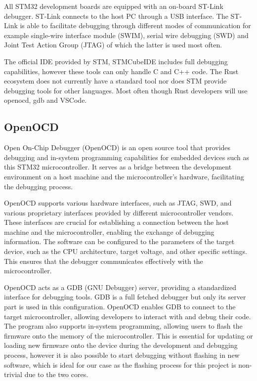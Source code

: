 All STM32 development boards are equipped with an on-board ST-Link debugger. ST-Link connects to the host PC through a USB interface. The ST-Link is able to facilitate debugging through different modes of communication for example single-wire interface module (SWIM), serial wire debugging (SWD) and Joint Test Action Group (JTAG) of which the latter is used most often.

The official IDE provided by STM, STMCubeIDE includes full debugging capabilities, however these tools can only handle C and C++ code. The Rust ecosystem does not currently have a standard tool nor does STM provide debugging tools for other languages. Most often though Rust developers will use openocd, gdb and VSCode.

\subsection{OpenOCD}

Open On-Chip Debugger (OpenOCD) is an open source tool that provides debugging and in-system programming capabilities for embedded devices such as this STM32 microcontroller. It serves as a bridge between the development environment on a host machine and the microcontroller's hardware, facilitating the debugging process.

OpenOCD supports various hardware interfaces, such as JTAG, SWD, and various proprietary interfaces provided by different microcontroller vendors. These interfaces are crucial for establishing a connection between the host machine and the microcontroller, enabling the exchange of debugging information. The software can be configured to the parameters of the target device, such as the CPU architecture, target voltage, and other specific settings. This ensures that the debugger communicates effectively with the microcontroller.

OpenOCD acts as a GDB (GNU Debugger) server, providing a standardized interface for debugging tools. GDB is a full fetched debugger but only its server part is used in this configuration. OpenOCD enables GDB to connect to the target microcontroller, allowing developers to interact with and debug their code. The program also supports in-system programming, allowing users to flash the firmware onto the memory of the microcontroller. This is essential for updating or loading new firmware onto the device during the development and debugging process, however it is also possible to start debugging without flashing in new software, which is ideal for our case as the flashing process for this project is non-trivial due to the two cores.

